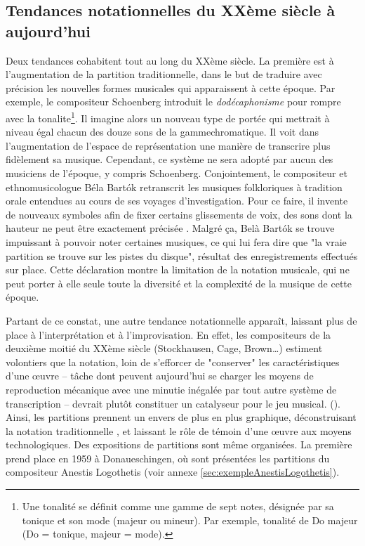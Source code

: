\subsection{Tendances notationnelles du XXème siècle à aujourd'hui}
\label{subsec:tendancesNotationnellesXX}
Deux tendances cohabitent tout au long du XXème siècle. 
La première est à l'augmentation de la partition traditionnelle, dans le but de traduire avec précision les nouvelles formes musicales qui apparaissent à cette époque.
Par exemple, le compositeur Schoenberg introduit le \textit{dodécaphonisme} pour rompre avec la \gls{tonalite}\footnote{Une tonalité se définit comme une gamme de sept notes, désignée par sa tonique et son mode (majeur ou mineur). Par exemple, tonalité de Do majeur (Do = tonique, majeur = mode).}. Il imagine alors un nouveau type de portée qui mettrait à niveau égal chacun des douze sons de la \gls{gammechromatique}. Il voit dans l'augmentation de l'espace de représentation une manière de transcrire plus fidèlement sa musique. Cependant, ce système ne sera adopté par aucun des musiciens de l'époque, y compris Schoenberg.
Conjointement, le compositeur et ethnomusicologue Béla Bart\'{o}k retranscrit les musiques folkloriques à tradition orale entendues au cours de ses voyages d'investigation. Pour ce faire, il invente de nouveaux symboles afin de fixer \og certains glissements de voix, des sons dont la hauteur ne peut être exactement précisée \fg \cite[94]{bosseur2005}.
Malgré ça, Belà Bart\'{o}k se trouve impuissant à pouvoir noter certaines musiques, ce qui lui fera dire que "la vraie partition se trouve sur les pistes du disque", résultat des enregistrements effectués sur place.
Cette déclaration montre la limitation de la notation musicale, qui ne peut porter à elle seule toute la diversité et la complexité de la musique de cette époque.

Partant de ce constat, une autre tendance notationnelle apparaît, laissant plus de place à l'interprétation et à l'improvisation. 
En effet, les compositeurs de la deuxième moitié du XXème siècle (Stockhausen, Cage, Brown…) \og estiment volontiers que la notation, loin de s'efforcer de "conserver" les caractéristiques d'une œuvre -- tâche dont peuvent aujourd'hui se charger les moyens de reproduction mécanique avec une minutie inégalée par tout autre système de transcription -- devrait plutôt constituer un catalyseur pour le jeu musical. \fg (\cite[115]{bosseur2005}).
Ainsi, les partitions prennent un envers de plus en plus graphique, déconstruisant la notation \og traditionnelle \fg, et laissant le rôle de témoin d'une œuvre aux moyens technologiques.
Des expositions de partitions sont même organisées. La première prend place en 1959 à Donaueschingen, où sont présentées les partitions du compositeur Anestis Logothetis (voir annexe \ref{sec:exempleAnestisLogothetis}).

